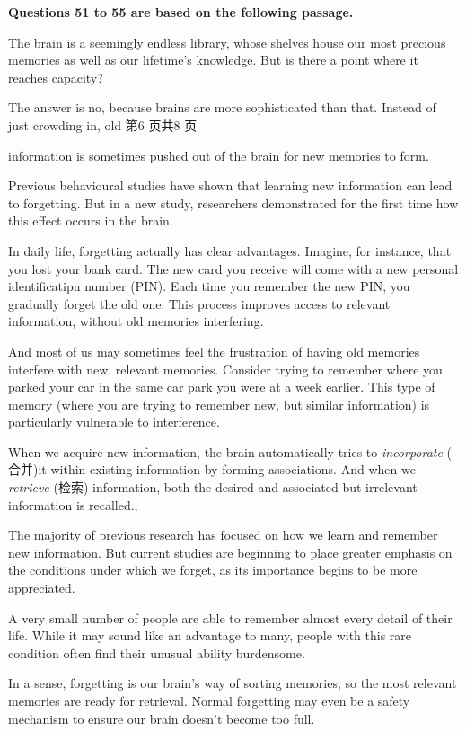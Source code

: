 \documentclass[UTF8,11pt]{ctexart}
\begin{document}
\textbf{Questions 51 to 55 are based on the following passage.}


The brain is a seemingly endless library, whose shelves house our most precious memories as well as our lifetime’s knowledge. But is there a point where it reaches capacity?


The answer is no, because brains are more sophisticated than that. Instead of just crowding in, old 第6 页共8 页


information is sometimes pushed out of the brain for new memories to form.


Previous behavioural studies have shown that learning new information can lead to forgetting. But in a new study, researchers demonstrated for the first time how this effect occurs in the brain.


In daily life, forgetting actually has clear advantages. Imagine, for instance, that you lost your bank card. The new card you receive will come with a new personal identificatipn number (PIN). Each time you remember the new PIN, you gradually forget the old one. This process improves access to relevant information, without old memories interfering.


And most of us may sometimes feel the frustration of having old memories interfere with new, relevant memories. Consider trying to remember where you parked your car in the same car park you were at a week earlier. This type of memory (where you are trying to remember new, but similar information) is particularly vulnerable to interference.


When we acquire new information, the brain automatically tries to\textit{ incorporate} ( 合并)it within existing information by forming associations. And when we\textit{ retrieve} (检索) information, both the desired and associated but irrelevant information is recalled.,


The majority of previous research has focused on how we learn and remember new information. But current studies are beginning to place greater emphasis on the conditions under which we forget, as its importance begins to be more appreciated.


A very small number of people are able to remember almost every detail of their life. While it may sound like an advantage to many, people with this rare condition often find their unusual ability burdensome.


In a sense, forgetting is our brain’s way of sorting memories, so the most relevant memories are ready for retrieval. Normal forgetting may even be a safety mechanism to ensure our brain doesn’t become too full.
\end{document}
